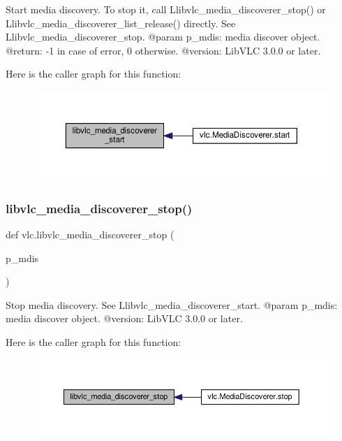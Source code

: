 \begin{DoxyVerb}Start media discovery.
To stop it, call L{libvlc_media_discoverer_stop}() or
L{libvlc_media_discoverer_list_release}() directly.
See L{libvlc_media_discoverer_stop}.
@param p_mdis: media discover object.
@return: -1 in case of error, 0 otherwise.
@version: LibVLC 3.0.0 or later.
\end{DoxyVerb}
 Here is the caller graph for this function\+:
\nopagebreak
\begin{figure}[H]
\begin{center}
\leavevmode
\includegraphics[width=350pt]{namespacevlc_a717cf33da5cb426ea198e5cc7c23fcac_icgraph}
\end{center}
\end{figure}
\mbox{\label{namespacevlc_a90f5d66c443b544188e64f67dc85e95a}} 
\subsubsection{\texorpdfstring{libvlc\+\_\+media\+\_\+discoverer\+\_\+stop()}{libvlc\_media\_discoverer\_stop()}}
{\footnotesize\ttfamily def vlc.\+libvlc\+\_\+media\+\_\+discoverer\+\_\+stop (\begin{DoxyParamCaption}\item[{}]{p\+\_\+mdis }\end{DoxyParamCaption})}

\begin{DoxyVerb}Stop media discovery.
See L{libvlc_media_discoverer_start}.
@param p_mdis: media discover object.
@version: LibVLC 3.0.0 or later.
\end{DoxyVerb}
 Here is the caller graph for this function\+:
\nopagebreak
\begin{figure}[H]
\begin{center}
\leavevmode
\includegraphics[width=350pt]{namespacevlc_a90f5d66c443b544188e64f67dc85e95a_icgraph}
\end{center}
\end{figure}
\mbox{\label{namespacevlc_a20f923172a3ea8b7f3c254e234336d7b}} 
